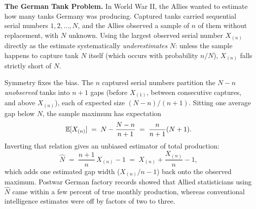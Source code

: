 \begin{paradoxbox}
\textbf{The German Tank Problem.} In World War II, the Allies wanted to estimate how many
tanks Germany was producing. Captured tanks carried sequential serial numbers
$1,2,\dots,N$, and the Allies observed a sample of $n$ of them without replacement, with
$N$ unknown. Using the largest observed serial number $X_{(n)}$ directly as the estimate
systematically \emph{underestimates} $N$: unless the sample happens to capture tank $N$
itself (which occurs with probability $n/N$), $X_{(n)}$ falls strictly short of $N$.

Symmetry fixes the bias. The $n$ captured serial numbers partition the $N - n$
\emph{unobserved} tanks into $n + 1$ gaps (before $X_{(1)}$, between consecutive
captures, and above $X_{(n)}$), each of expected size $(N - n)/(n + 1)$. Sitting one
average gap below $N$, the sample maximum has expectation
\[
  \operatorname{\mathbb{E}}[X_{(n)}] \;=\; N - \frac{N - n}{n + 1} \;=\; \frac{n}{n + 1}(N + 1).
\]
Inverting that relation gives an unbiased estimator of total production:
\[
  \hat N \;=\; \frac{n + 1}{n}\,X_{(n)} - 1 \;=\; X_{(n)} + \frac{X_{(n)}}{n} - 1,
\]
which adds one estimated gap width ($X_{(n)}/n - 1$) back onto the observed maximum.
Postwar German factory records showed that Allied statisticians using $\hat N$ came
within a few percent of true monthly production, whereas conventional intelligence
estimates were off by factors of two to three.
\end{paradoxbox}

